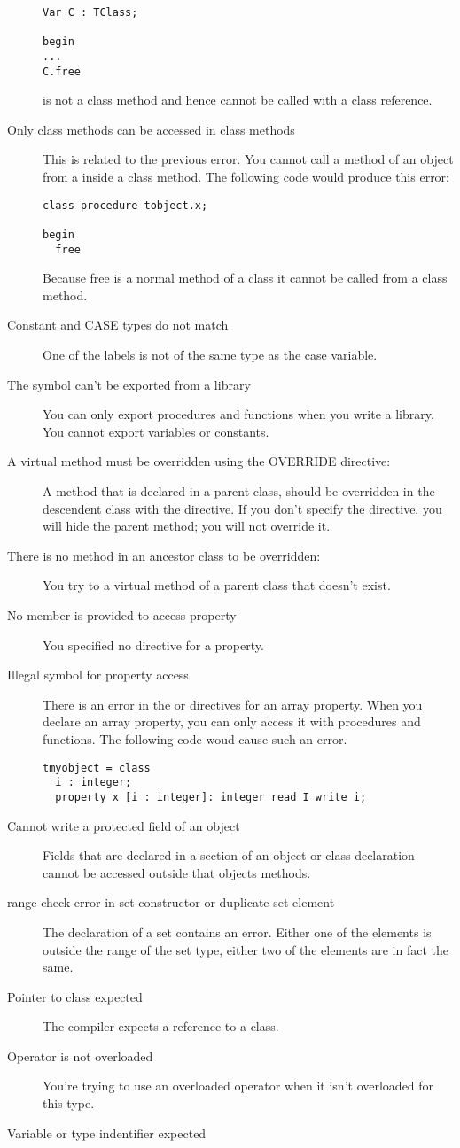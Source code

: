 \documentclass{report}
\begin{document}
\begin{description}
\begin{verbatim}
Var C : TClass;

begin
...
C.free
\end{verbatim}
 is not a class method and hence cannot be called with a class
reference.
\item [ Only class methods can be accessed in class methods ]
This is related to the previous error. You cannot call a method of an object
from a inside a class method. The following code would produce this error:
\begin{verbatim}
class procedure tobject.x;

begin
  free
\end{verbatim}
Because free is a normal method of a class it cannot be called from a class
method.
\item [ Constant and CASE types do not match ]
One of the labels is not of the same type as the case variable.
\item [ The symbol can't be exported from a library ]
You can only export procedures and functions when you write a library. You
cannot export variables or constants.
\item [ A virtual method must be overridden using the OVERRIDE directive: ]
A method that is declared  in a parent class, should be
overridden in the descendent class with the  directive. If you
don't specify the  directive, you will hide the parent method;
you will not override it.
\item [ There is no method in an ancestor class to be overridden: ]
You try to  a virtual method of a parent class that doesn't
exist.
\item [ No member is provided to access property ]
You specified no  directive for a property. 
\item [ Illegal symbol for property access ]
There is an error in the  or  directives for an array 
property. When you declare an array property, you can only access it with 
procedures and functions. The following code woud cause such an error.
\begin{verbatim}
tmyobject = class
  i : integer;
  property x [i : integer]: integer read I write i;
\end{verbatim}
 
\item [ Cannot write a protected field of an object ]
Fields that are declared in a  section of an object or class
declaration cannot be accessed outside that objects methods.
\item [ range check error in set constructor or duplicate set element ]
The declaration of a set contains an error. Either one of the elements is
outside the range of the set type, either two of the elements are in fact
the same.
\item [ Pointer to class expected ]
The compiler expects a reference to a class.
\item [ Operator is not overloaded ]
You're trying to use an overloaded operator when it isn't overloaded for
this type.
\item [ Variable or type indentifier expected ]


\end{description}
\end{document}
